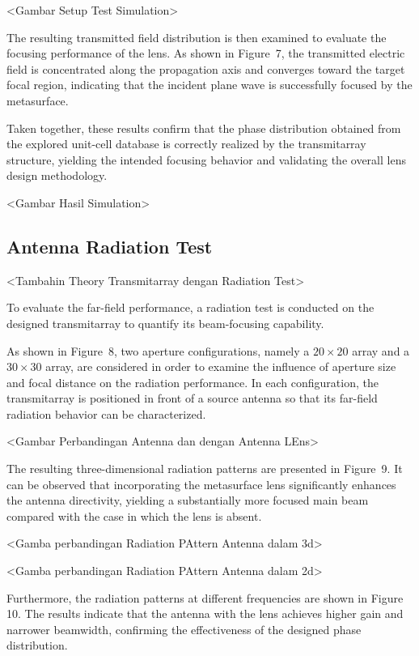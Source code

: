 <Gambar Setup Test Simulation>

The resulting transmitted field distribution is then examined to evaluate the focusing performance of the lens. As shown in Figure~7, the transmitted electric field is concentrated along the propagation axis and converges toward the target focal region, indicating that the incident plane wave is successfully focused by the metasurface.

Taken together, these results confirm that the phase distribution obtained from the explored unit-cell database is correctly realized by the transmitarray structure, yielding the intended focusing behavior and validating the overall lens design methodology.

<Gambar Hasil Simulation>

\subsection{Antenna Radiation Test}
<Tambahin Theory Transmitarray dengan Radiation Test>

To evaluate the far-field performance, a radiation test is conducted on the designed transmitarray to quantify its beam-focusing capability.

As shown in Figure~8, two aperture configurations, namely a $20 \times 20$ array and a $30 \times 30$ array, are considered in order to examine the influence of aperture size and focal distance on the radiation performance. In each configuration, the transmitarray is positioned in front of a source antenna so that its far-field radiation behavior can be characterized.

<Gambar Perbandingan Antenna dan dengan Antenna LEns>

The resulting three-dimensional radiation patterns are presented in Figure~9. It can be observed that incorporating the metasurface lens significantly enhances the antenna directivity, yielding a substantially more focused main beam compared with the case in which the lens is absent.

<Gamba perbandingan Radiation PAttern Antenna dalam 3d>

<Gamba perbandingan Radiation PAttern Antenna dalam 2d>

Furthermore, the radiation patterns at different frequencies are shown in Figure 10. The results indicate that the antenna with the lens achieves higher gain and narrower beamwidth, confirming the effectiveness of the designed phase distribution.

